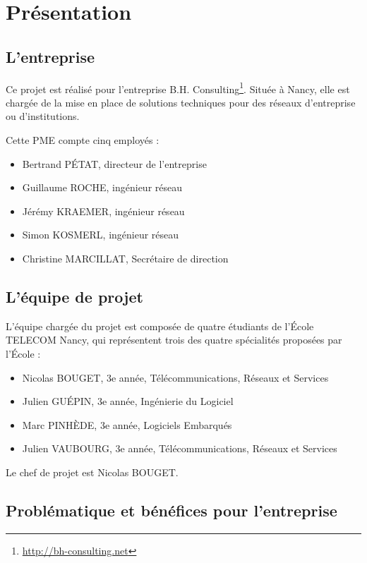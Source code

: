 \newcommand{\titreA}{Authentifications RADIUS}
\newcommand{\titreB}{Note de cadrage}


\section{Présentation}
\subsection{L'entreprise}

Ce projet est réalisé pour l'entreprise B.H. Consulting\footnote{\url{http://bh-consulting.net}}. Située à Nancy, elle est chargée de la mise en place de solutions techniques pour des réseaux d'entreprise ou d'institutions.

Cette PME compte cinq employés :

\begin{itemize}
\item Bertrand PÉTAT, directeur de l'entreprise
\item Guillaume ROCHE, ingénieur réseau
\item Jérémy KRAEMER, ingénieur réseau
\item Simon KOSMERL, ingénieur réseau
\item Christine MARCILLAT, Secrétaire de direction
\end{itemize}

\subsection{L'équipe de projet}

L'équipe chargée du projet est composée de quatre étudiants de l'École TELECOM Nancy, qui représentent trois des quatre spécialités proposées par l'École :

\begin{itemize}
\item Nicolas BOUGET, 3e année, Télécommunications, Réseaux et Services
\item Julien GUÉPIN, 3e année, Ingénierie du Logiciel
\item Marc PINHÈDE, 3e année, Logiciels Embarqués
\item Julien VAUBOURG, 3e année, Télécommunications, Réseaux et Services
\end{itemize}

Le chef de projet est Nicolas BOUGET.

\subsection{Problématique et bénéfices pour l'entreprise}

